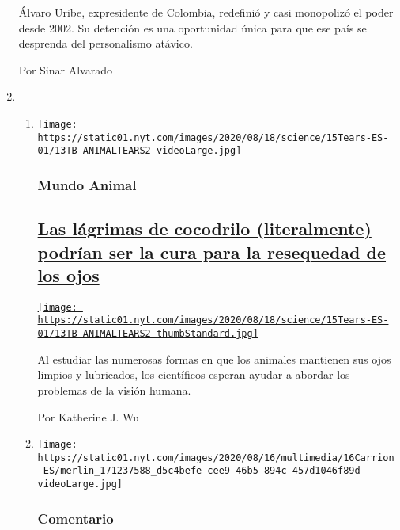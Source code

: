 \begin{enumerate}
  Álvaro Uribe, expresidente de Colombia, redefinió y casi monopolizó el
  poder desde 2002. Su detención es una oportunidad única para que ese
  país se desprenda del personalismo atávico.

  Por Sinar Alvarado
\item
  \begin{enumerate}
  \def\labelenumii{\arabic{enumii}.}
  \item
    \texttt{[image: https://static01.nyt.com/images/2020/08/18/science/15Tears-ES-01/13TB-ANIMALTEARS2-videoLarge.jpg]}

    \hypertarget{mundo-animal}{%
    \subsubsection{Mundo Animal}\label{mundo-animal}}

    \hypertarget{las-luxe1grimas-de-cocodrilo-literalmente-podruxedan-ser-la-cura-para-la-resequedad-de-los-ojos}{%
    \subsection{\texorpdfstring{\href{/es/2020/08/15/espanol/ciencia-y-tecnologia/ojo-seco.html}{Las
    lágrimas de cocodrilo (literalmente) podrían ser la cura para la
    resequedad de los
    ojos}}{Las lágrimas de cocodrilo (literalmente) podrían ser la cura para la resequedad de los ojos}}\label{las-luxe1grimas-de-cocodrilo-literalmente-podruxedan-ser-la-cura-para-la-resequedad-de-los-ojos}}

    \href{/es/2020/08/15/espanol/ciencia-y-tecnologia/ojo-seco.html}{\texttt{[image: https://static01.nyt.com/images/2020/08/18/science/15Tears-ES-01/13TB-ANIMALTEARS2-thumbStandard.jpg]}}

    Al estudiar las numerosas formas en que los animales mantienen sus
    ojos limpios y lubricados, los científicos esperan ayudar a abordar
    los problemas de la visión humana.

    Por Katherine J. Wu
  \item
    \texttt{[image: https://static01.nyt.com/images/2020/08/16/multimedia/16Carrion-ES/merlin\_171237588\_d5c4befe-cee9-46b5-894c-457d1046f89d-videoLarge.jpg]}

    \hypertarget{comentario-1}{%
    \subsubsection{Comentario}\label{comentario-1}}


\end{enumerate}
\end{enumerate}
